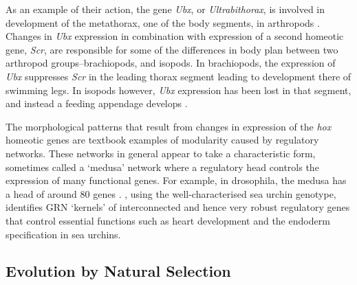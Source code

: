 As an example of their action, the gene \emph{Ubx}, or \emph{Ultrabithorax}, is involved in development of the \gls{metathorax}, one of the body segments, in \glspl{arthropod} \parencite[pg. 696-697]{Watson:2008fm}. Changes in \emph{Ubx} expression in combination with expression of a second homeotic gene, \emph{Scr}, are responsible for some of the differences in body plan between two arthropod groups--brachiopods, and isopods. In brachiopods, the expression of \emph{Ubx} suppresses \emph{Scr} in the leading thorax segment leading to development there of swimming legs. In isopods however, \emph{Ubx} expression has been lost in that segment, and instead a feeding appendage develops \parencite{Watson:2008fm}.

The morphological patterns that result from changes in expression of the \emph{hox} homeotic genes are textbook examples of modularity caused by regulatory networks. These networks in general appear to take a characteristic form, sometimes called a `medusa' network \parencite{Kauffman:2004zi,Aldana:2007da} where a regulatory head controls the expression of many functional genes. For example, in \gls{drosophila}, the medusa has a head of around 80 genes \parencite{Aldana:2007da}. \Textcite{Davidson:2006wi}, using the well-characterised sea urchin genotype, identifies GRN `kernels' of interconnected and hence very robust regulatory genes that control essential functions such as heart development and the endoderm specification in sea urchins. 

\subsection{Evolution by Natural Selection}\label{evolution-by-natural-selection}




